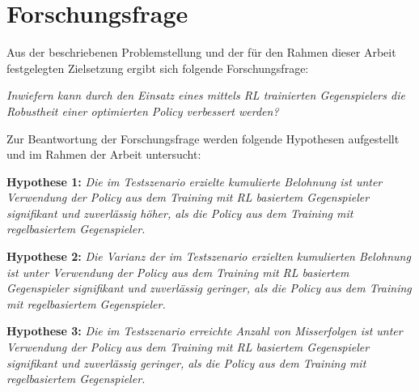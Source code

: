 \section{Forschungsfrage}

Aus der beschriebenen Problemstellung und der für den Rahmen dieser Arbeit festgelegten Zielsetzung ergibt sich folgende Forschungsfrage: 

\textit{Inwiefern kann durch den Einsatz eines mittels RL trainierten Gegenspielers die Robustheit einer optimierten Policy verbessert werden?}

Zur Beantwortung der Forschungsfrage werden folgende Hypothesen aufgestellt und im Rahmen der Arbeit untersucht:

\textbf{Hypothese 1:}
\textit{Die im Testszenario erzielte kumulierte Belohnung ist unter Verwendung der Policy aus dem Training mit RL basiertem Gegenspieler signifikant und zuverlässig höher, als die Policy aus dem Training mit regelbasiertem Gegenspieler.}

\textbf{Hypothese 2:}
\textit{Die Varianz der im Testszenario erzielten kumulierten Belohnung ist unter Verwendung der Policy aus dem Training mit RL basiertem Gegenspieler signifikant und zuverlässig geringer, als die Policy aus dem Training mit regelbasiertem Gegenspieler.}

\textbf{Hypothese 3:}
\textit{Die im Testszenario erreichte Anzahl von Misserfolgen ist unter Verwendung der Policy aus dem Training mit RL basiertem Gegenspieler signifikant und zuverlässig geringer, als die Policy aus dem Training mit regelbasiertem Gegenspieler.}

